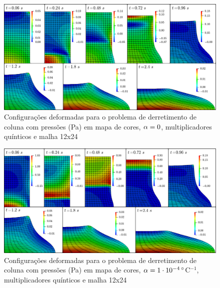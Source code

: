 \documentclass[Tese.tex]{subfiles}
\begin{document}
\begin{figure}[!htb]
	\centering
	\caption{Configurações deformadas para o problema de derretimento de coluna com pressões (Pa) em mapa de cores, $\alpha = 0$, multiplicadores quínticos e malha 12x24}
	\label{fig:PhaseChangeDam-pressure}
	\includegraphics[width=\textwidth]{Figuras/PhaseChangeDam/pressure.png}
\end{figure}

\begin{figure}[!htb]
	\centering
	\caption{Configurações deformadas para o problema de derretimento de coluna com pressões (Pa) em mapa de cores, $\alpha = 1\cdot 10^{-4}\,^{\circ}$C$^{-1}$, multiplicadores quínticos e malha 12x24}
	\label{fig:PhaseChangeDam-pressure-a1e-4}
	\includegraphics[width=\textwidth]{Figuras/PhaseChangeDam/pressure-a1e-4.png}
\end{figure}
\end{document}
